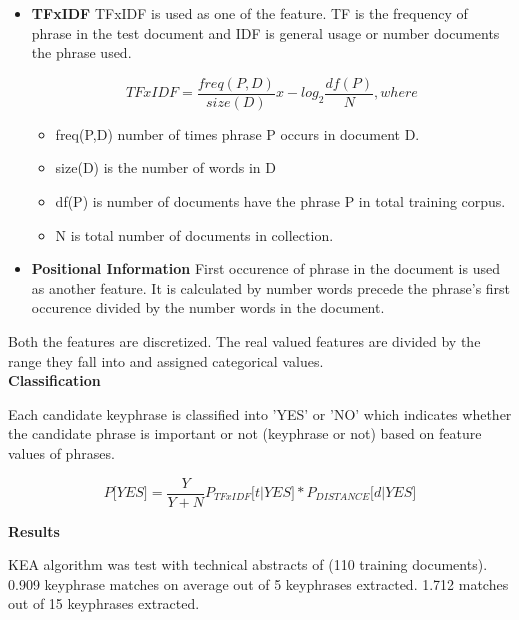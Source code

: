 \begin{itemize}
\item \textbf{TFxIDF}
TFxIDF is used as one of the feature. TF is the frequency of phrase in the test document and IDF is general usage or number documents the phrase used.

\begin{equation}
TFxIDF = \frac{freq(P,D)}{size(D)} x -log_{2} \frac{df(P)}{N}, where
\end{equation}
\begin{itemize}
\item{freq(P,D) number of times phrase P occurs in document D.}
\item{size(D) is the number of words in D}
\item{df(P) is number of documents have the phrase P in total training corpus.}
\item{N is total number of documents in collection.}
\end{itemize}

\item \textbf{Positional Information}
First occurence of phrase in the document is used as another feature. It is calculated by number words precede the phrase's first occurence divided by the number words in the document.

\end{itemize}

Both the features are discretized. The real valued features are divided by the range they fall into and assigned categorical values.\\

\noindent \textbf{Classification}

Each candidate keyphrase is classified into 'YES' or 'NO' which indicates whether the candidate phrase is important or not (keyphrase or not) based on feature values of phrases.

\begin{equation}
P\lbrack YES \rbrack = \frac{Y}{Y+N} P_{TFxIDF} \lbrack t|YES \rbrack * P_{DISTANCE} \lbrack d|YES \rbrack
\end{equation}

\noindent \textbf{Results}

KEA algorithm was test with technical abstracts of (110 training documents). 0.909 keyphrase matches on average out of 5 keyphrases extracted.  1.712 matches out of 15 keyphrases extracted.

